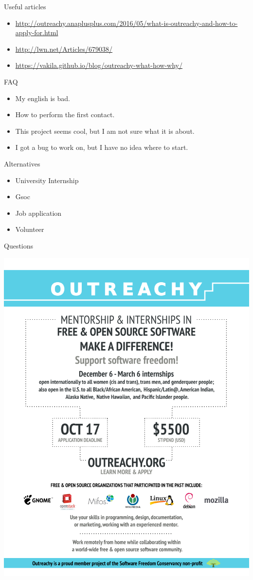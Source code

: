 \documentclass[pdf]{beamer}
\begin{document}
\begin{frame}{Useful articles}
  \begin{itemize}
    \item \url{http://outreachy.anaplusplus.com/2016/05/what-is-outreachy-and-how-to-apply-for.html}
    \item \url{http://lwn.net/Articles/679038/}
    \item \url{https://vakila.github.io/blog/outreachy-what-how-why/}
  \end{itemize}
\end{frame}

\begin{frame}{FAQ}
  \begin{itemize}
    \item My english is bad.
    \item How to perform the first contact.
    \item This project seems cool, but I am not sure what it is about.
    \item I got a bug to work on, but I have no idea where to start.
  \end{itemize}
\end{frame}

\begin{frame}{Alternatives}
  \begin{itemize}
    \item University Internship
    \item Gsoc
    \item Job application
    \item Volunteer
  \end{itemize}
\end{frame}

\begin{frame}{Questions}
  \begin{center}
    \includegraphics[scale=0.28]{img/outreachy-applicants-2016-December.png}
  \end{center}
\end{frame}
\end{document}
